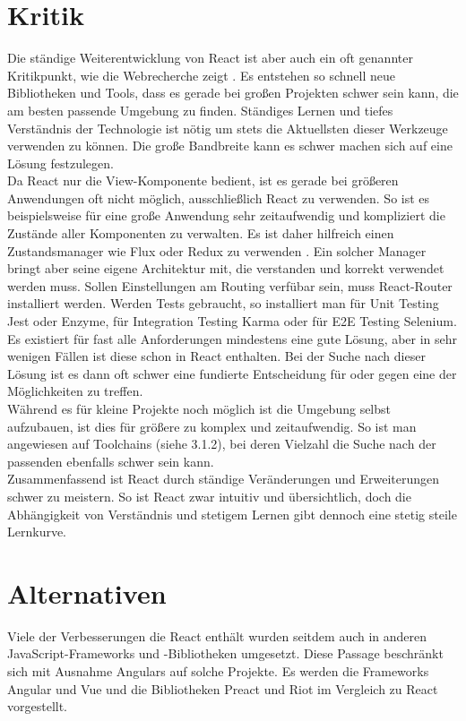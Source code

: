 \section{Kritik}
Die ständige Weiterentwicklung von React ist aber auch ein oft genannter Kritikpunkt, wie die Webrecherche zeigt \cite{7}. Es entstehen so schnell neue Bibliotheken und Tools, dass es gerade bei großen Projekten schwer sein kann, die am besten passende Umgebung zu finden. Ständiges Lernen und tiefes Verständnis der Technologie ist nötig um stets die Aktuellsten dieser Werkzeuge verwenden zu können. Die große Bandbreite kann es schwer machen sich auf eine Lösung festzulegen. \\
Da React nur die View-Komponente bedient, ist es gerade bei größeren Anwendungen oft nicht möglich, ausschließlich React zu verwenden. So ist es beispielsweise für eine große Anwendung sehr zeitaufwendig und kompliziert die Zustände aller Komponenten zu verwalten. Es ist daher hilfreich einen Zustandsmanager wie Flux oder Redux zu verwenden \cite{5}. Ein solcher Manager bringt aber seine eigene Architektur mit, die verstanden und korrekt verwendet werden muss. Sollen Einstellungen am Routing verfübar sein, muss React-Router installiert werden. Werden Tests gebraucht, so installiert man für Unit Testing Jest oder Enzyme, für Integration Testing Karma oder für E2E Testing Selenium. Es existiert für fast alle Anforderungen mindestens eine gute Lösung, aber in sehr wenigen Fällen ist diese schon in React enthalten. Bei der Suche nach dieser Lösung ist es dann oft schwer eine fundierte Entscheidung für oder gegen eine der Möglichkeiten zu treffen. \\
Während es für kleine Projekte noch möglich ist die Umgebung selbst aufzubauen, ist dies für größere zu komplex und zeitaufwendig. So ist man angewiesen auf Toolchains (siehe 3.1.2), bei deren Vielzahl die Suche nach der passenden ebenfalls schwer sein kann. \\
Zusammenfassend ist React durch ständige Veränderungen und Erweiterungen schwer zu meistern. So ist React zwar intuitiv und übersichtlich, doch die Abhängigkeit von Verständnis und stetigem Lernen gibt dennoch eine stetig steile Lernkurve. 

\section{Alternativen}
Viele der Verbesserungen die React enthält wurden seitdem auch in anderen JavaScript-Frameworks und -Bibliotheken umgesetzt. Diese Passage beschränkt sich mit Ausnahme Angulars auf solche Projekte. Es werden die Frameworks Angular und Vue und die Bibliotheken Preact und Riot im Vergleich zu React vorgestellt.\\
